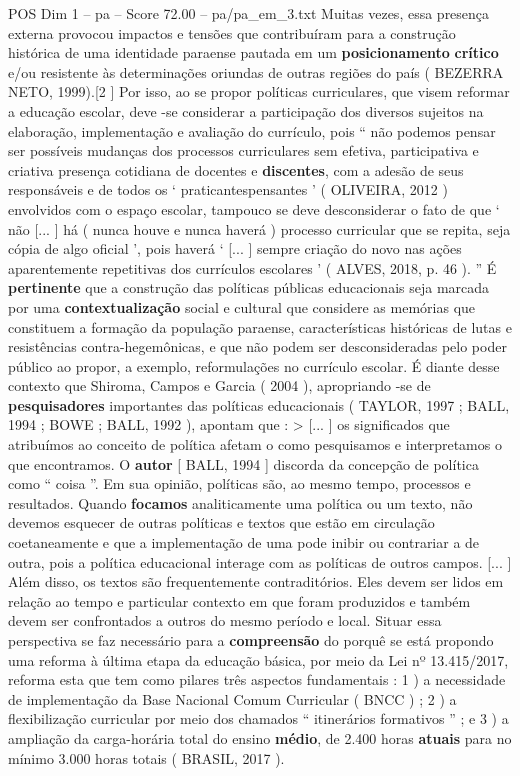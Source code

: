 \begin{textsample}{POS Dim 1 – pa – Score 72.00 – pa/pa\_em\_3.txt}
Muitas vezes, essa presença externa provocou impactos e tensões que contribuíram para a construção histórica de uma identidade paraense pautada em um \textbf{posicionamento} \textbf{crítico} e/ou resistente às determinações oriundas de outras regiões do país ( BEZERRA NETO, 1999).[2 ] Por isso, ao se propor políticas curriculares, que visem reformar a educação escolar, deve -se considerar a participação dos diversos sujeitos na elaboração, implementação e avaliação do currículo, pois “ não podemos pensar ser possíveis mudanças dos processos curriculares sem efetiva, participativa e criativa presença cotidiana de docentes e \textbf{discentes}, com a adesão de seus responsáveis e de todos os ‘ praticantespensantes ’ ( OLIVEIRA, 2012 ) envolvidos com o espaço escolar, tampouco se deve desconsiderar o fato de que ‘ não [... ] há ( nunca houve e nunca haverá ) processo curricular que se repita, seja cópia de algo oficial ’, pois haverá ‘ [... ] sempre criação do novo nas ações aparentemente repetitivas dos currículos escolares ’ ( ALVES, 2018, p. 46 ). ” É \textbf{pertinente} que a construção das políticas públicas educacionais seja marcada por uma \textbf{contextualização} social e cultural que considere as memórias que constituem a formação da população paraense, características históricas de lutas e resistências contra-hegemônicas, e que não podem ser desconsideradas pelo poder público ao propor, a exemplo, reformulações no currículo escolar.
É diante desse contexto que Shiroma, Campos e Garcia ( 2004 ), apropriando -se de \textbf{pesquisadores} importantes das políticas educacionais ( TAYLOR, 1997 ; BALL, 1994 ; BOWE ; BALL, 1992 ), apontam que : > [... ] os significados que atribuímos ao conceito de política afetam o como pesquisamos e interpretamos o que encontramos.
O \textbf{autor} [ BALL, 1994 ] discorda da concepção de política como “ coisa ”.
Em sua opinião, políticas são, ao mesmo tempo, processos e resultados.
Quando \textbf{focamos} analiticamente uma política ou um texto, não devemos esquecer de outras políticas e textos que estão em circulação coetaneamente e que a implementação de uma pode inibir ou contrariar a de outra, pois a política educacional interage com as políticas de outros campos. [... ] Além disso, os textos são frequentemente contraditórios.
Eles devem ser lidos em relação ao tempo e particular contexto em que foram produzidos e também devem ser confrontados a outros do mesmo período e local.
Situar essa perspectiva se faz necessário para a \textbf{compreensão} do porquê se está propondo uma reforma à última etapa da educação básica, por meio da Lei nº 13.415/2017, reforma esta que tem como pilares três aspectos fundamentais : 1 ) a necessidade de implementação da Base Nacional Comum Curricular ( BNCC ) ; 2 ) a flexibilização curricular por meio dos chamados “ itinerários formativos ” ; e 3 ) a ampliação da carga-horária total do ensino \textbf{médio}, de 2.400 horas \textbf{atuais} para no mínimo 3.000 horas totais ( BRASIL, 2017 ).

\end{textsample}
